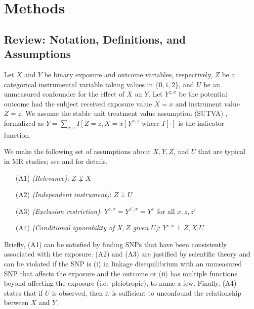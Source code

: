\documentclass[
]{article}
\providecommand{\tightlist}{%
  \setlength{\itemsep}{0pt}\setlength{\parskip}{0pt}}
\theoremstyle{plain}
\begin{document}
\hypertarget{methods}{%
\section{\texorpdfstring{Methods \label{setup}}{Methods }}\label{methods}}

\hypertarget{review-notation-definitions-and-assumptions}{%
\subsection{Review: Notation, Definitions, and Assumptions}\label{review-notation-definitions-and-assumptions}}

\label{notation-and-definitions}

Let \(X\) and \(Y\) be binary exposure and outcome variables, respectively, \(Z\) be a categorical instrumental variable taking values in \(\{0, 1, 2\}\), and \(U\) be an unmeasured confounder for the effect of \(X\) on \(Y\). Let \(Y^{z,x}\) be the potential outcome \autocite{rubin_estimating_1974,splawa-neyman_application_1990} had the subject received exposure value \(X = x\) and instrument value \(Z = z\). We assume the stable unit treatment value assumption (SUTVA) \autocite{cox_planning_1958,rubin_randomization_1980}, formalized as \(Y = \sum_{x,z} I[Z = z, X = x] Y^{x,z}\) where \(I[\cdot]\) is the indicator function.

We make the following set of assumptions about \(X, Y, Z\), and \(U\) that are typical in MR studies; see \textcite{didelez_mendelian_2007} and \textcite{wang_bounded_2018} for details.

\begin{itemize}
\tightlist
\item[(A1)] \emph{(Relevance)}: $Z \not\perp X$ 
\item[(A2)] \emph{(Independent instrument)}: $Z \perp U$
\item[(A3)] \emph{(Exclusion restriction)}: $Y^{z,x} = Y^{z',x} = Y^{x}$ for all $x,z,z'$
\item[(A4)] \emph{(Conditional ignorability of $X,Z$ given $U$)}: $Y^{z,x} \perp Z, X | U$
\end{itemize}

Briefly, (A1) can be satisfied by finding SNPs that have been consistently associated with the exposure. (A2) and (A3) are justified by scientific theory and can be violated if the SNP is (i) in linkage disequilibrium with an unmeasured SNP that affects the exposure and the outcome or (ii) has multiple functions beyond affecting the exposure (i.e.~pleiotropic), to name a few. Finally, (A4) states that if \(U\) is observed, then it is sufficient to unconfound the relationship between \(X\) and \(Y\).
\end{document}
